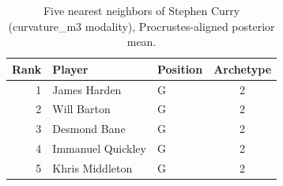 \begin{table}[htbp]
  \centering\small
  \begin{tabular}{rllc}
    \toprule
    Rank & Player & Position & Archetype \\
    \midrule
    1 & James Harden & G & 2 \\
    2 & Will Barton & G & 2 \\
    3 & Desmond Bane & G & 2 \\
    4 & Immanuel Quickley & G & 2 \\
    5 & Khris Middleton & G & 2 \\
    \bottomrule
  \end{tabular}
  \caption{Five nearest neighbors of Stephen Curry (curvature_m3 modality), Procrustes-aligned posterior mean.}
  \label{tab:Stephen_Curry_neighbors_curvature_m3}
\end{table}

